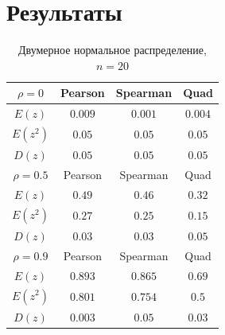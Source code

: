 \documentclass[a4]{article}
\begin{document}
\section{Результаты}

\begin{table}[H]
	\caption{Двумерное нормальное распределение, $n=20$}
	\label{tab:my_label3}
	\begin{center}
		\vspace{5mm}
		\begin{tabular}{|c|c|c|c|}
			\hline
			$ \rho=0 $ & Pearson & Spearman & Quad\\
			\hline
			$ E(z) $ & $ 0.009 $ & $ 0.001 $ & $ 0.004 $\\
			\hline
			$ E(z^{2}) $ & $ 0.05 $ & $ 0.05 $ & $ 0.05 $\\
			\hline
			$ D(z) $  & $ 0.05 $ & $ 0.05 $ & $ 0.05 $\\
			\hline
			$ \rho=0.5 $ & Pearson & Spearman & Quad\\
			\hline
			$ E(z) $ & $ 0.49 $ & $ 0.46 $ & $ 0.32 $\\
			\hline
			$ E(z^{2}) $ & $ 0.27 $ & $ 0.25 $ & $ 0.15 $\\
			\hline
			$ D(z) $  & $ 0.03 $ & $ 0.03 $ & $ 0.05 $ \\
			\hline
			$ \rho=0.9 $ & Pearson & Spearman & Quad\\
			\hline
			$ E(z) $ & $ 0.893 $ & $ 0.865 $ & $ 0.69 $\\
			\hline
			$ E(z^{2}) $ & $ 0.801 $ & $ 0.754 $ & $ 0.5 $\\
			\hline
			$ D(z) $  & $ 0.003 $ & $ 0.05 $ & $ 0.03 $ \\
			\hline
		\end{tabular}
	\end{center}
\end{table}
\end{document}
